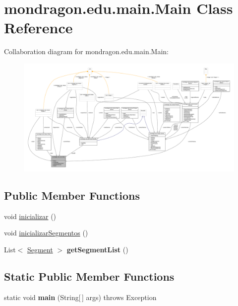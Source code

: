 \hypertarget{classmondragon_1_1edu_1_1main_1_1_main}{}\section{mondragon.\+edu.\+main.\+Main Class Reference}
\label{classmondragon_1_1edu_1_1main_1_1_main}


Collaboration diagram for mondragon.\+edu.\+main.\+Main\+:
\nopagebreak
\begin{figure}[H]
\begin{center}
\leavevmode
\includegraphics[width=350pt]{classmondragon_1_1edu_1_1main_1_1_main__coll__graph}
\end{center}
\end{figure}
\subsection*{Public Member Functions}
\begin{DoxyCompactItemize}
\item 
void \mbox{\hyperlink{classmondragon_1_1edu_1_1main_1_1_main_a16bc67d233e57a27e356f84c214f09a8}{inicializar}} ()
\item 
void \mbox{\hyperlink{classmondragon_1_1edu_1_1main_1_1_main_a31f9a39c9349efab4a8addeb531d4669}{inicializar\+Segmentos}} ()
\item 
\mbox{\label{classmondragon_1_1edu_1_1main_1_1_main_a2a66565c912ed53337aa4adea4c2a2e5}} 
List$<$ \mbox{\hyperlink{classmondragon_1_1edu_1_1clases_1_1_segment}{Segment}} $>$ {\bfseries get\+Segment\+List} ()
\end{DoxyCompactItemize}
\subsection*{Static Public Member Functions}
\begin{DoxyCompactItemize}
\item 
\mbox{\label{classmondragon_1_1edu_1_1main_1_1_main_ac704ab917389980fd393b02223882bf5}} 
static void {\bfseries main} (String\mbox{[}$\,$\mbox{]} args)  throws Exception 
\end{DoxyCompactItemize}


